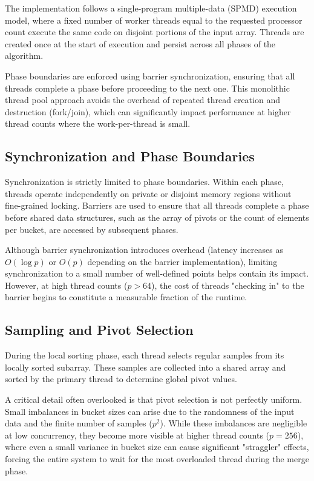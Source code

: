 \documentclass[11pt]{article}
\begin{document}
The implementation follows a single-program multiple-data (SPMD) execution model, where a fixed number of worker threads equal to the requested processor count execute the same code on disjoint portions of the input array. Threads are created once at the start of execution and persist across all phases of the algorithm. 

Phase boundaries are enforced using barrier synchronization, ensuring that all threads complete a phase before proceeding to the next one. This monolithic thread pool approach avoids the overhead of repeated thread creation and destruction (fork/join), which can significantly impact performance at higher thread counts where the work-per-thread is small.

\subsection{Synchronization and Phase Boundaries}

Synchronization is strictly limited to phase boundaries. Within each phase, threads operate independently on private or disjoint memory regions without fine-grained locking. Barriers are used to ensure that all threads complete a phase before shared data structures, such as the array of pivots or the count of elements per bucket, are accessed by subsequent phases.

Although barrier synchronization introduces overhead (latency increases as $O(\log p)$ or $O(p)$ depending on the barrier implementation), limiting synchronization to a small number of well-defined points helps contain its impact. However, at high thread counts ($p > 64$), the cost of threads "checking in" to the barrier begins to constitute a measurable fraction of the runtime.

\subsection{Sampling and Pivot Selection}

During the local sorting phase, each thread selects regular samples from its locally sorted subarray. These samples are collected into a shared array and sorted by the primary thread to determine global pivot values. 

A critical detail often overlooked is that pivot selection is not perfectly uniform. Small imbalances in bucket sizes can arise due to the randomness of the input data and the finite number of samples ($p^2$). While these imbalances are negligible at low concurrency, they become more visible at higher thread counts ($p=256$), where even a small variance in bucket size can cause significant "straggler" effects, forcing the entire system to wait for the most overloaded thread during the merge phase.
\end{document}
